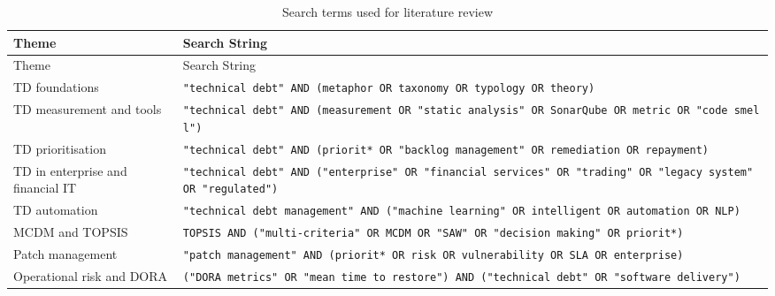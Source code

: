 \documentclass[
  12pt,
  letterpaper,
  12pt,
  oneside,
  english,
  onehalfspacing,
  headsepline]{MastersDoctoralThesis}
\begin{document}
\begin{longtable}[]{@{}
  >{\raggedright\arraybackslash}p{}
  >{\raggedright\arraybackslash}p{}@{}}
\caption{Search terms used for literature
review}\label{tbl-search-terms}\tabularnewline
\toprule\noalign{}
\begin{minipage}[b]{\linewidth}\raggedright
Theme
\end{minipage} & \begin{minipage}[b]{\linewidth}\raggedright
Search String
\end{minipage} \\
\midrule\noalign{}
\endfirsthead
\toprule\noalign{}
\begin{minipage}[b]{\linewidth}\raggedright
Theme
\end{minipage} & \begin{minipage}[b]{\linewidth}\raggedright
Search String
\end{minipage} \\
\midrule\noalign{}
\endhead
\bottomrule\noalign{}
\endlastfoot
TD foundations &
\texttt{"technical\ debt"\ AND\ (metaphor\ OR\ taxonomy\ OR\ typology\ OR\ theory)} \\
TD measurement and tools &
\texttt{"technical\ debt"\ AND\ (measurement\ OR\ "static\ analysis"\ OR\ SonarQube\ OR\ metric\ OR\ "code\ smell")} \\
TD prioritisation &
\texttt{"technical\ debt"\ AND\ (priorit*\ OR\ "backlog\ management"\ OR\ remediation\ OR\ repayment)} \\
TD in enterprise and financial IT &
\texttt{"technical\ debt"\ AND\ ("enterprise"\ OR\ "financial\ services"\ OR\ "trading"\ OR\ "legacy\ system"\ OR\ "regulated")} \\
TD automation &
\texttt{"technical\ debt\ management"\ AND\ ("machine\ learning"\ OR\ intelligent\ OR\ automation\ OR\ NLP)} \\
MCDM and TOPSIS &
\texttt{TOPSIS\ AND\ ("multi-criteria"\ OR\ MCDM\ OR\ "SAW"\ OR\ "decision\ making"\ OR\ priorit*)} \\
Patch management &
\texttt{"patch\ management"\ AND\ (priorit*\ OR\ risk\ OR\ vulnerability\ OR\ SLA\ OR\ enterprise)} \\
Operational risk and DORA &
\texttt{("DORA\ metrics"\ OR\ "mean\ time\ to\ restore")\ AND\ ("technical\ debt"\ OR\ "software\ delivery")} \\
\end{longtable}
\end{document}
